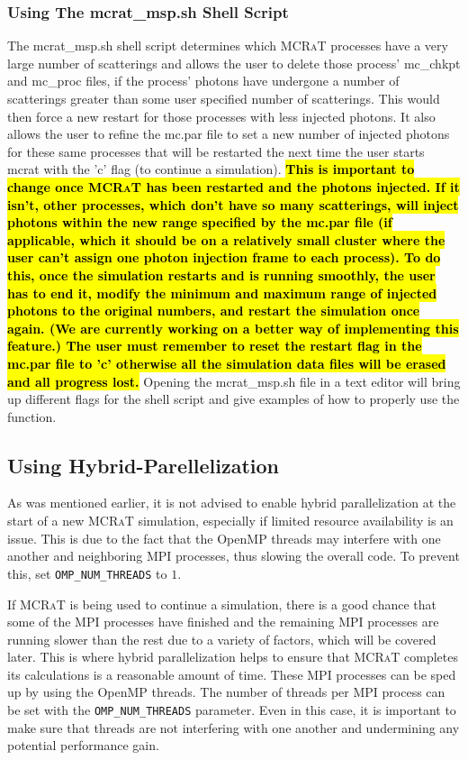 \documentclass[12pt,a4paper]{article}
\newcommand{\mcrat}{\textsc{MCRaT}}
\begin{document}
 \subsubsection{Using The mcrat\_msp.sh Shell Script}
 The mcrat\_msp.sh shell script determines which \mcrat{} processes have a very large number of scatterings and allows the user to delete those process' mc\_chkpt and mc\_proc files, if the process' photons have undergone a number of scatterings greater than some user specified number of scatterings. This would then force a new restart for those processes with less injected photons. It also allows the user to refine the mc.par file to set a new number of injected photons for these same processes that will be restarted the next time the user starts mcrat with the 'c' flag (to continue a simulation). \hl{\bf This is important to change once \mcrat{} has been restarted and the photons injected. If it isn't, other processes, which don't have so many scatterings, will inject photons within the new range specified by the mc.par file (if applicable, which it should be on a relatively small cluster where the user can't assign one photon injection frame to each process). To do this, once the simulation restarts and is running smoothly, the user has to end it, modify the minimum and maximum range of injected photons to the original numbers, and restart the simulation once again. (We are currently working on a better way of implementing this feature.) The user must remember to reset the restart flag in the mc.par file to 'c' otherwise all the simulation data files will be erased and all progress lost.} Opening the mcrat\_msp.sh file in a text editor will bring up different flags for the shell script and give examples of how to properly use the function.
 
 \subsection{Using Hybrid-Parellelization}
 As was mentioned earlier, it is not advised to enable hybrid parallelization at the start of a new \mcrat{} simulation, especially if limited resource availability is an issue. This is due to the fact that the OpenMP threads may interfere with one another and neighboring MPI processes, thus slowing the overall code. To prevent this, set \texttt{OMP\_NUM\_THREADS} to $1$.
 
 If \mcrat{} is being used to continue a simulation, there is a good chance that some of the MPI processes have finished and the remaining MPI processes are running slower than the rest due to a variety of factors, which will be covered later. This is where hybrid parallelization helps to ensure that \mcrat{} completes its calculations is a reasonable amount of time. These MPI processes can be sped up by using the OpenMP threads. The number of threads per MPI process can be set with the \texttt{OMP\_NUM\_THREADS} parameter. Even in this case, it is important to make sure that threads are not interfering with one another and undermining any potential performance gain.
 
\end{document}
